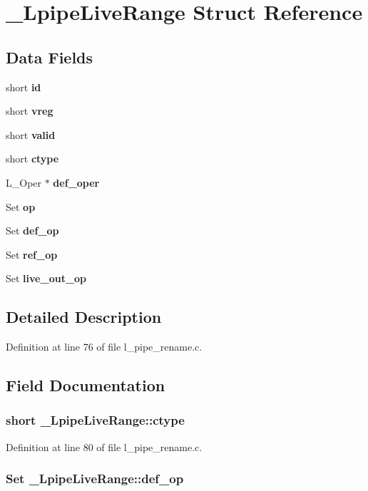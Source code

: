 \section{\_\-Lpipe\-Live\-Range Struct Reference}
\label{struct__LpipeLiveRange}
\subsection*{Data Fields}
\begin{CompactItemize}
\item 
short \bf{id}
\item 
short \bf{vreg}
\item 
short \bf{valid}
\item 
short \bf{ctype}
\item 
L\_\-Oper $\ast$ \bf{def\_\-oper}
\item 
Set \bf{op}
\item 
Set \bf{def\_\-op}
\item 
Set \bf{ref\_\-op}
\item 
Set \bf{live\_\-out\_\-op}
\end{CompactItemize}


\subsection{Detailed Description}




Definition at line 76 of file l\_\-pipe\_\-rename.c.

\subsection{Field Documentation}
\subsubsection{\setlength{\rightskip}{0pt plus 5cm}short \bf{\_\-Lpipe\-Live\-Range::ctype}}\label{struct__LpipeLiveRange_114e7d202fd6c56252b179a987435368}




Definition at line 80 of file l\_\-pipe\_\-rename.c.
\subsubsection{\setlength{\rightskip}{0pt plus 5cm}Set \bf{\_\-Lpipe\-Live\-Range::def\_\-op}}\label{struct__LpipeLiveRange_10f91cde610906ee066d5f3ff5621cff}




